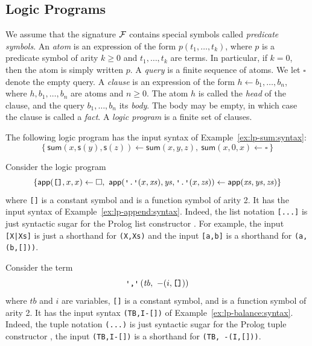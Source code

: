 \subsection{Logic Programs}
We assume that the signature $\mathcal{F}$ contains special symbols called
\emph{predicate symbols}.
An \emph{atom} is an expression of the form $p(t_1, \ldots, t_k)$, where
$p$ is a predicate symbol of arity $k \ge 0$ and $t_1, \ldots, t_k$ are
terms. In particular, if $k = 0$, then the atom is simply written $p$.
A \emph{query} is a finite sequence of atoms. We let $\square$ denote
the empty query.
A \emph{clause} is an expression of the form $h \leftarrow b_1,\ldots,b_n$,
where $h,b_1,\ldots,b_n$ are atoms and $n \ge 0$.
The atom $h$ is called the \emph{head} of the clause, and the query
$b_1,\ldots,b_n$ its \emph{body}. The body may be empty, in which case
the clause is called a \emph{fact}. A \emph{logic program} is a finite
set of clauses.

\begin{example}\label{ex:lp-sum:semantics}
  The following logic program has the input syntax of Example~\ref{ex:lp-sum:syntax}:
  \[\left\{
    \mathsf{sum}(x, \mathsf{s}(y), \mathsf{s}(z)) \leftarrow \mathsf{sum}(x, y, z),\
    \mathsf{sum}(x, 0, x) \leftarrow \square
  \right\}\]
\end{example}

\begin{example}\label{ex:lp-append:semantics}
  Consider the logic program 
  \[\left\{
    \mathsf{app}(\texttt{[]}, x, x) \leftarrow \square,\
    \mathsf{app}(\pldot(x,\mathit{xs}), \mathit{ys}, \pldot(x,\mathit{zs}))
    \leftarrow \mathsf{app}(\mathit{xs}, \mathit{ys}, \mathit{zs})
  \right\}\]
  where \texttt{[]} is a constant symbol and \pldot{} is
  a function symbol of arity 2.
  It has the input syntax of Example~\ref{ex:lp-append:syntax}.
  Indeed, the list notation \verb+[...]+ is just syntactic sugar for the 
  Prolog list constructor \pldot. For example,
  the input \verb+[X|Xs]+ is just a shorthand for \pldot\verb+(X,Xs)+
  and the input \verb+[a,b]+ is a shorthand for
  \pldot\verb+(a,+\pldot\verb+(b,[]))+.
\end{example}

\begin{example}\label{ex:lp-balance:semantics}
  Consider the term
  \[\plcomma\left(\mathit{tb},\ -(i,\texttt{[]})\right)\]
  where $\mathit{tb}$ and $i$ are variables,
  \texttt{[]} is a constant symbol, and
  \plcomma{} is a function symbol of arity 2.
  It has the input syntax \verb+(TB,I-[])+ of
  Example~\ref{ex:lp-balance:syntax}.
  Indeed, the tuple notation \verb+(...)+ is just syntactic
  sugar for the Prolog tuple constructor \plcomma, \ie
  the input \verb+(TB,I-[])+ is a shorthand for
  \plcomma\verb+(TB, -(I,[]))+.
\end{example}

